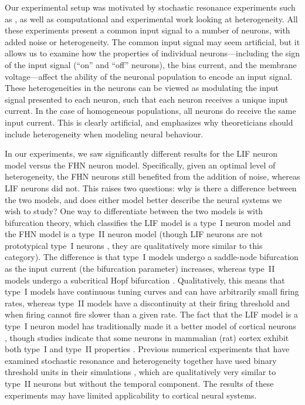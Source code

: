 \documentclass[12pt]{article}
\begin{document}
Our experimental setup was motivated by stochastic resonance experiments such as \cite{Stocks2001}, as well as computational \citep{Brody2003} and experimental \citep{Padmanabhan2010} work looking at heterogeneity. All these experiments present a common input signal to a number of neurons, with added noise or heterogeneity. The common input signal may seem artificial, but it allows us to examine how the properties of individual neurons---including the sign of the input signal (``on'' and ``off'' neurons), the bias current, and the membrane voltage---affect the ability of the neuronal population to encode an input signal. These heterogeneities in the neurons can be viewed as modulating the input signal presented to each neuron, such that each neuron receives a unique input current. In the case of homogeneous populations, all neurons do receive the same input current. This is clearly artificial, and emphasizes why theoreticians should include heterogeneity when modeling neural behaviour.

In our experiments, we saw significantly different results for the LIF neuron model versus the FHN neuron model. Specifically, given an optimal level of heterogeneity, the FHN neurons still benefited from the addition of noise, whereas LIF neurons did not. This raises two questions: why is there a difference between the two models, and does either model better describe the neural systems we wish to study? One way to differentiate between the two models is with bifurcation theory, which classifies the LIF model is a type~I neuron model and the FHN model is a type~II neuron model (though LIF neurons are not prototypical type~I neurons \citep{Mato2008}, they are qualitatively more similar to this category). The difference is that type~I models undergo a saddle-node bifurcation as the input current (the bifurcation parameter) increases, whereas type~II models undergo a subcritical Hopf bifurcation \citep{Mato2008}. Qualitatively, this means that type~I models have continuous tuning curves and can have arbitrarily small firing rates, whereas type~II models have a discontinuity at their firing threshold and when firing cannot fire slower than a given rate. The fact that the LIF model is a type~I neuron model has traditionally made it a better model of cortical neurons \citep{Koch1999}, though studies indicate that some neurons in mammalian (rat) cortex exhibit both type~I and type~II properties \citep{Tateno2004,Tsubo2007}. Previous numerical experiments that have examined stochastic resonance and heterogeneity together have used binary threshold units in their simulations \citep{Stocks2000,McDonnell2006}, which are qualitatively very similar to type~II neurons but without the temporal component. The results of these experiments may have limited applicability to cortical neural systems.
\end{document}
